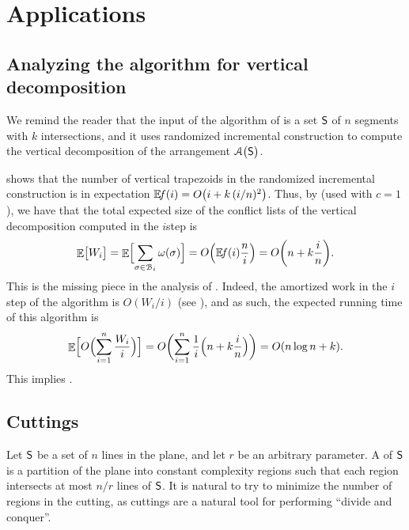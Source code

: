 \section{Applications}

\subsection{Analyzing the \RIC algorithm for %
   vertical decomposition}

We remind the reader that the input of the algorithm of
 is a set $\mathsf{S}$ of $n$ segments with $k$
intersections, and it uses randomized incremental construction to
compute the vertical decomposition of the arrangement
$\ArrX{\bigl.\SegSet}$.

 shows that the number of vertical trapezoids in
the randomized incremental construction is in expectation
$\NumOfRegionsZero{i} = O\pth{ i + k\, (i/n)^2}$.  Thus, by
 (used with $c=1$), we have that the total expected size
of the conflict lists of the vertical decomposition computed in the
$i$\th step is
\begin{equation*}
    \Ex{\bigl. W_i}%
    =%
    \Ex{ \Bigl. \smash{\sum_{\Trap \in \ArrB_i} \WeightX{\Trap} } }%
    =%
    O \pth{ \NumOfRegionsZero{i}\frac{n}{i}}%
    =%
    O \pth{ n + k \frac{i}{n}}.
\end{equation*}

This is the missing piece in the analysis of
. Indeed, the amortized work in the $i$\th
step of the algorithm is $O(W_i/i)$ (see ),
and as such, the expected running time of this algorithm is
\begin{equation*}
    \Ex{  O \pth{\Bigl.
          \smash{\sum_{i=1}^n \frac{W_i}{i} }
       }
    } %
    =%
    O \biggl( \sum_{i=1}^n \frac{1}{i} \Bigl({ n + k \frac{i}{n}} \Bigr) \biggr)%
    =%
    O\pth{ n \log n + k }.
\end{equation*}
This implies .



\subsection{Cuttings}

Let $\mathsf{S}$ be a set of $n$ lines in the plane, and let $r$ be an
arbitrary parameter. A  of $\mathsf{S}$
is a partition of the plane into constant complexity regions such that
each region intersects at most $n/r$ lines of $\mathsf{S}$. It is natural
to try to minimize the number of regions in the cutting, as cuttings
are a natural tool for performing ``divide and conquer''.

